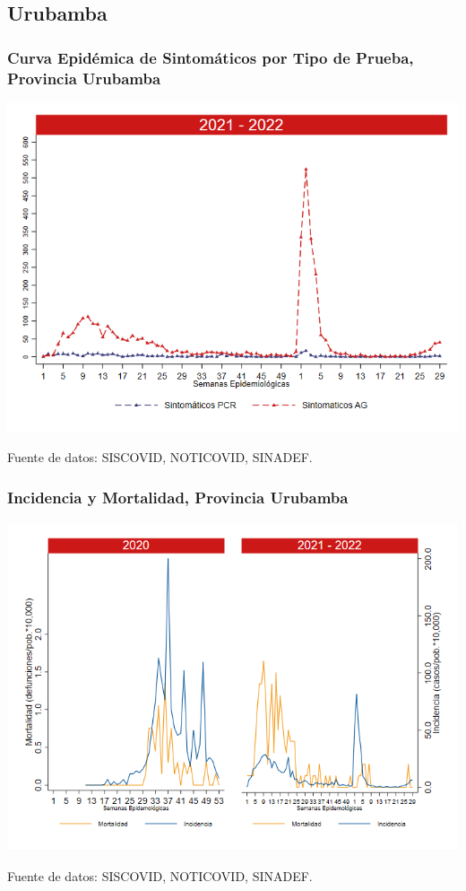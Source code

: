 \documentclass[xcolor=table]{beamer}
\begin{document}
\subsection{Urubamba}
\begin{frame}[label=Urubamba]
	\frametitle{Curva Epidémica de Sintomáticos por Tipo de Prueba, Provincia Urubamba}
	\vspace{-.5cm}
	\begin{center}
		\includegraphics[width=0.8\linewidth, trim={0cm .5cm 0cm 0.2cm},clip]{../figuras/sinto_prueba20_21_13.png}
	\end{center}
	{\tiny Fuente de datos: SISCOVID, NOTICOVID, SINADEF.}
	\hyperlink{TipoPrueba}{}
\end{frame}

\begin{frame}[label=Urubamba]
	\frametitle{\large Incidencia y Mortalidad, Provincia Urubamba}
	\vspace{-.5cm}
	\begin{center}
		\includegraphics[width=0.8\linewidth, trim={0cm .5cm 0cm 0.2cm},clip]{../figuras/incidencia_mortalidad_20_21_13.png}
	\end{center}
	{\tiny Fuente de datos: SISCOVID, NOTICOVID, SINADEF.}
\end{frame}
\end{document}
